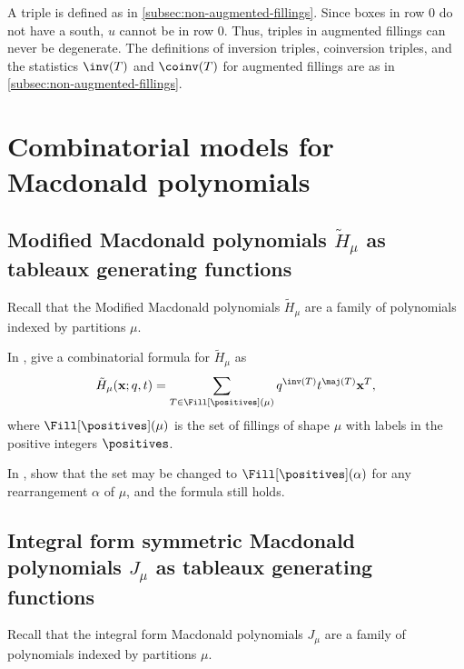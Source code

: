 A triple is defined as in \cref{subsec:non-augmented-fillings}.
Since boxes in row \(0\) do not have a south, \(u\) cannot be in row \(0\).
Thus, triples in augmented fillings can never be degenerate.
The definitions of inversion triples, coinversion triples, and the statistics \(\inv(T)\) and \(\coinv(T)\) for augmented fillings are as in \cref{subsec:non-augmented-fillings}.

\section{Combinatorial models for Macdonald polynomials}

\subsection{Modified Macdonald polynomials \texorpdfstring{\(\tilde{H}_\mu\)}{H̃μ} as tableaux generating functions}

Recall that the Modified Macdonald polynomials \(\tilde{H}_\mu\) are a family of polynomials indexed by partitions \(\mu\).

In \cite{HHL05}, \citeauthor{HHL05} give a combinatorial formula for \(\tilde{H}_\mu\) as 
\begin{equation}
	\tilde{H}_\mu(\mathbf{x}; q, t) =
	\sum_{T \in \Fill[\positives](\mu)} q^{\inv(T)} t^{\maj(T)} \mathbf{x}^T,
\end{equation}
where \(\Fill[\positives](\mu)\) is the set of fillings of shape \(\mu\) with labels in the positive integers \(\positives\).

In \cite{HHL08}, \citeauthor{HHL08} show that the set may be changed to \(\Fill[\positives](\alpha)\) for any rearrangement \(\alpha\) of \(\mu\), and the formula still holds.

\subsection{Integral form symmetric Macdonald polynomials \texorpdfstring{\(J_\mu\)}{Jμ} as tableaux generating functions}

Recall that the integral form Macdonald polynomials \(J_\mu\) are a family of polynomials indexed by partitions \(\mu\).

